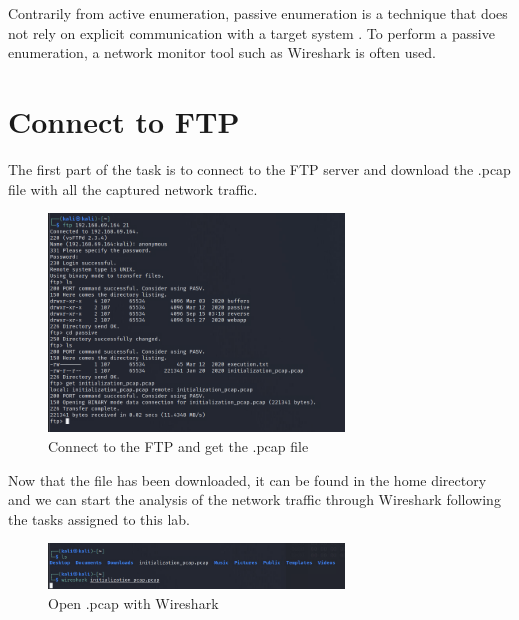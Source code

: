 Contrarily from active enumeration, passive enumeration is a technique that does
not rely on explicit communication with a target system
\citep{cooperWhatDifferenceActive2020}. To perform a passive enumeration, a
network monitor tool such as Wireshark is often used.

\section{Connect to FTP}
\label{s:Connect-To-FTP}
The first part of the task is to connect to the FTP server and download the .pcap
file with all the captured network traffic.

\begin{figure}[H]
  \centering
  \includegraphics[width=0.7\textwidth]{figures/ftp-get-pcap}
  \caption{Connect to the FTP and get the .pcap file}
  \label{f:ftp-get-pcap}
\end{figure}

Now that the file has been downloaded, it can be found in the home directory
and we can start the analysis of the network traffic through Wireshark following the
tasks assigned to this lab.
\begin{figure}[H]
  \centering
  \includegraphics[width=0.7\textwidth]{figures/wireshark-pcap}
  \caption{Open .pcap with Wireshark}
  \label{f:wireshark-pcap}
\end{figure}

